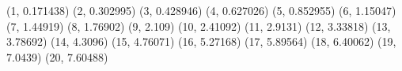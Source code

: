 (1, 0.171438) (2, 0.302995) (3, 0.428946) (4, 0.627026) (5, 0.852955) (6, 1.15047) (7, 1.44919) (8, 1.76902) (9, 2.109) (10, 2.41092) (11, 2.9131) (12, 3.33818) (13, 3.78692) (14, 4.3096) (15, 4.76071) (16, 5.27168) (17, 5.89564) (18, 6.40062) (19, 7.0439) (20, 7.60488) 